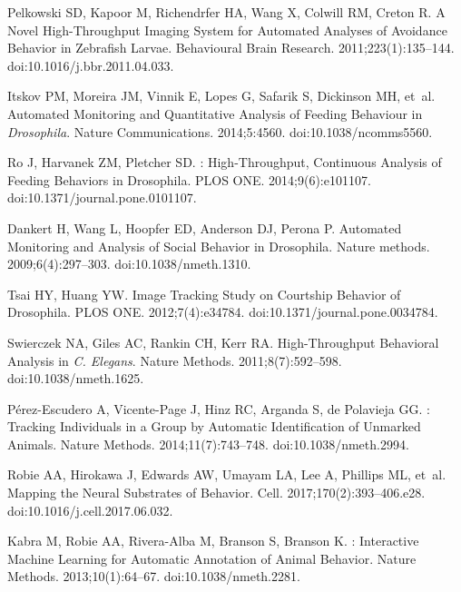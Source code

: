 \documentclass[10pt,letterpaper]{article}\usepackage[]{graphicx}\usepackage[]{color}
\begin{document}
\begin{thebibliography}{10}
	Pelkowski SD, Kapoor M, Richendrfer HA, Wang X, Colwill RM, Creton R.
	\newblock A Novel High-Throughput Imaging System for Automated Analyses of
	Avoidance Behavior in Zebrafish Larvae.
	\newblock Behavioural Brain Research. 2011;223(1):135--144.
	\newblock doi:{10.1016/j.bbr.2011.04.033}.
	
	Itskov PM, Moreira JM, Vinnik E, Lopes G, Safarik S, Dickinson MH, et~al.
	\newblock Automated Monitoring and Quantitative Analysis of Feeding Behaviour
	in {{{\emph{Drosophila}}}}.
	\newblock Nature Communications. 2014;5:4560.
	\newblock doi:{10.1038/ncomms5560}.
	
	Ro J, Harvanek ZM, Pletcher SD.
	: {{High}}-{{Throughput}}, {{Continuous Analysis}} of
	{{Feeding Behaviors}} in {{Drosophila}}.
	\newblock PLOS ONE. 2014;9(6):e101107.
	\newblock doi:{10.1371/journal.pone.0101107}.
	
	Dankert H, Wang L, Hoopfer ED, Anderson DJ, Perona P.
	\newblock Automated {{Monitoring}} and {{Analysis}} of {{Social Behavior}} in
	{{Drosophila}}.
	\newblock Nature methods. 2009;6(4):297--303.
	\newblock doi:{10.1038/nmeth.1310}.
	
	Tsai HY, Huang YW.
	\newblock Image {{Tracking Study}} on {{Courtship Behavior}} of {{Drosophila}}.
	\newblock PLOS ONE. 2012;7(4):e34784.
	\newblock doi:{10.1371/journal.pone.0034784}.
	
	Swierczek NA, Giles AC, Rankin CH, Kerr RA.
	\newblock High-Throughput Behavioral Analysis in {{{\emph{C}}}}{\emph{.
			Elegans}}.
	\newblock Nature Methods. 2011;8(7):592--598.
	\newblock doi:{10.1038/nmeth.1625}.
	
	P{\'e}rez-Escudero A, Vicente-Page J, Hinz RC, Arganda S, {de Polavieja} GG.
	: Tracking Individuals in a Group by Automatic
	Identification of Unmarked Animals.
	\newblock Nature Methods. 2014;11(7):743--748.
	\newblock doi:{10.1038/nmeth.2994}.
	
	Robie AA, Hirokawa J, Edwards AW, Umayam LA, Lee A, Phillips ML, et~al.
	\newblock Mapping the {{Neural Substrates}} of {{Behavior}}.
	\newblock Cell. 2017;170(2):393--406.e28.
	\newblock doi:{10.1016/j.cell.2017.06.032}.
	
	Kabra M, Robie AA, Rivera-Alba M, Branson S, Branson K.
	: Interactive Machine Learning for Automatic Annotation of
	Animal Behavior.
	\newblock Nature Methods. 2013;10(1):64--67.
	\newblock doi:{10.1038/nmeth.2281}.
	

\end{thebibliography}
\end{document}

